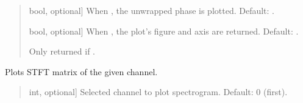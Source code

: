 \documentclass[letterpaper,10pt,english]{sphinxmanual}
\begin{document}
\begin{fulllineitems}
\begin{fulllineitems}
\begin{quote}
\begin{description}
\begin{description}
\sphinxlineitem{\sphinxstylestrong{unwrap}}{[}bool, optional{]}
\sphinxAtStartPar
When , the unwrapped phase is plotted. Default: .

\sphinxlineitem{\sphinxstylestrong{returns}}{[}bool, optional{]}
\sphinxAtStartPar
When , the plot’s figure and axis are returned.
Default: .

\end{description}

\begin{description}
\sphinxAtStartPar
Only returned if .

\end{description}

\end{description}\end{quote}

\end{fulllineitems}


\begin{fulllineitems}
\label{\detokenize{classes:dsptoolbox.classes.signal_class.Signal.plot_spectrogram}}
\pysigstartsignatures
{}
\pysigstopsignatures
\sphinxAtStartPar
Plots STFT matrix of the given channel.
\begin{quote}\begin{description}
\begin{description}
\sphinxlineitem{\sphinxstylestrong{channel\_number}}{[}int, optional{]}
\sphinxAtStartPar
Selected channel to plot spectrogram. Default: 0 (first).


\end{description}
\end{description}
\end{quote}
\end{fulllineitems}
\end{fulllineitems}
\end{document}
